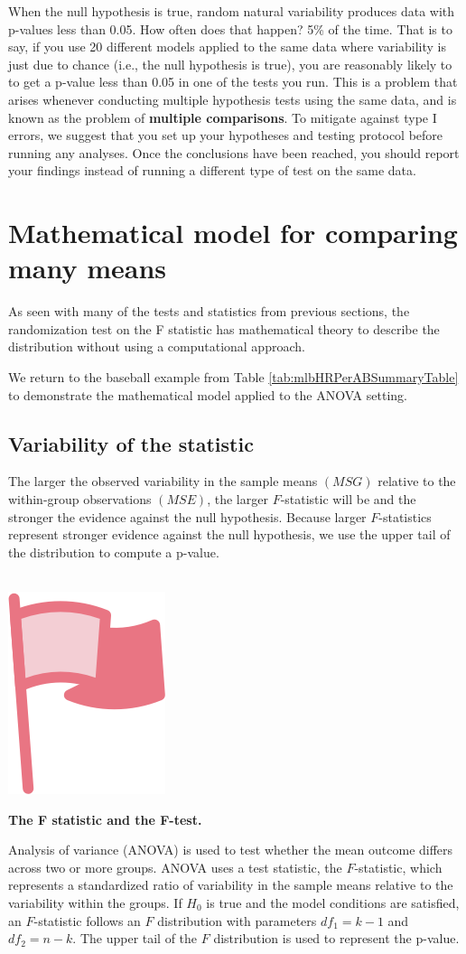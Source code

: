 \documentclass[
  10pt,
  openany]{book}
\newenvironment{mdframedwithfootImportant}
{   
    \savenotes
    \begin{mdframed}[%
    topline=true, bottomline=true, linecolor=oiR, linewidth=0.5pt,
    rightline=false, leftline=false,
    backgroundcolor=oiLGray]
    \renewcommand{\thempfootnote}{\arabic{footnote}}
    }
{
    \end{mdframed}
    \spewnotes
}
\newenvironment{important}{
    \let\oldtextbf\textbf
    \renewcommand{\textbf}[1]{{\textcolor{oiR}{\oldtextbf{##1}}}}
\vspace{4mm}
\begin{mdframedwithfootImportant}
\begin{minipage}[t]{0.10\textwidth}
{$\:$ \\ \setkeys{Gin}{width=2.5em,keepaspectratio}\includegraphics{images/_icons/important.png}}
\end{minipage}
\hfill
\begin{minipage}[t]{0.90\textwidth}
\vspace{-2mm}
\setlength{\parskip}{1em}
}{\end{minipage}
\end{mdframedwithfootImportant}
\vspace{4mm}
}
\begin{document}
When the null hypothesis is true, random natural variability produces data with p-values less than 0.05.
How often does that happen?
5\% of the time.
That is to say, if you use 20 different models applied to the same data where variability is just due to chance (i.e., the null hypothesis is true), you are reasonably likely to to get a p-value less than 0.05 in one of the tests you run.
This is a problem that arises whenever conducting multiple hypothesis tests using the same data, and is known as the problem of \textbf{multiple comparisons}.
To mitigate against type I errors, we suggest that you set up your hypotheses and testing protocol before running any analyses.
Once the conclusions have been reached, you should report your findings instead of running a different type of test on the same data.

\hypertarget{mathANOVA}{%
\section{Mathematical model for comparing many means}\label{mathANOVA}}

As seen with many of the tests and statistics from previous sections, the randomization test on the F statistic has mathematical theory to describe the distribution without using a computational approach.

We return to the baseball example from Table \ref{tab:mlbHRPerABSummaryTable} to demonstrate the mathematical model applied to the ANOVA setting.

\hypertarget{variability-of-the-statistic-18}{%
\subsection{Variability of the statistic}\label{variability-of-the-statistic-18}}

The larger the observed variability in the sample means \((MSG)\) relative to the within-group observations \((MSE)\), the larger \(F\)-statistic will be and the stronger the evidence against the null hypothesis.
Because larger \(F\)-statistics represent stronger evidence against the null hypothesis, we use the upper tail of the distribution to compute a p-value.

\begin{important}
\textbf{The F statistic and the F-test.}

Analysis of variance (ANOVA) is used to test whether the mean outcome differs across two or more groups.
ANOVA uses a test statistic, the \(F\)-statistic, which represents a standardized ratio of variability in the sample means relative to the variability within the groups.
If \(H_0\) is true and the model conditions are satisfied, an \(F\)-statistic follows an \(F\) distribution with parameters \(df_{1} = k - 1\) and \(df_{2} = n - k.\) The upper tail of the \(F\) distribution is used to represent the p-value.

\end{important}
\end{document}
